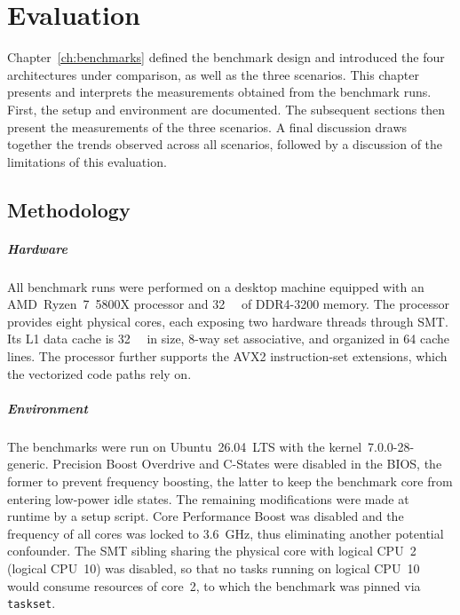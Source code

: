 
\cleardoubleoddpage
\chapter{Evaluation}
\label{sec:evaluation}
Chapter~\ref{ch:benchmarks} defined the benchmark design and introduced the four architectures under comparison, as well as the three scenarios. This chapter presents and interprets the measurements obtained from the benchmark runs. First, the setup and environment are documented. The subsequent sections then present the measurements of the three scenarios. A final discussion draws together the trends observed across all scenarios, followed by a discussion of the limitations of this evaluation.

\section{Methodology}
\label{sec:evaluation:methodology}
\paragraph{Hardware}
All benchmark runs were performed on a desktop machine equipped with an AMD~Ryzen~7~5800X processor and \qty{32}{\giga\byte} of DDR4-3200 memory. The processor provides eight physical cores, each exposing two hardware threads through \ac{SMT}. Its L1 data cache is \qty{32}{\kibi\byte} in size, 8-way set associative, and organized in \qty{64}{\byte} cache lines. The processor further supports the AVX2 instruction-set extensions, which the vectorized code paths rely on.

\paragraph{Environment}
The benchmarks were run on Ubuntu~26.04~LTS with the \mbox{kernel~7.0.0-28-generic}. Precision Boost Overdrive and C-States were disabled in the BIOS, the former to prevent frequency boosting, the latter to keep the benchmark core from entering low-power idle states. The remaining modifications were made at runtime by a setup script. Core Performance Boost was disabled and the frequency of all cores was locked to \qty{3.6}{\giga\hertz}, thus eliminating another potential confounder. The \ac{SMT} sibling sharing the physical core with logical CPU~2 (logical CPU~10) was disabled, so that no tasks running on logical CPU~10 would consume resources of core~2, to which the benchmark was pinned via \texttt{taskset}.

